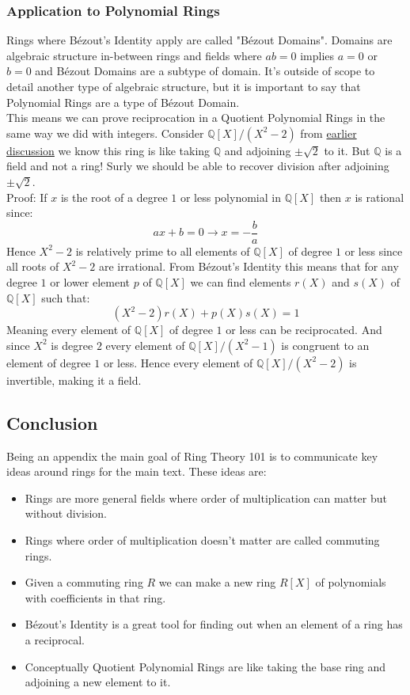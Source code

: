 \subsubsection{Application to Polynomial Rings}
Rings where Bézout's Identity apply are called "Bézout Domains".
Domains are algebraic structure in-between rings and fields where $ab=0$ implies $a=0$ or $b=0$ and Bézout Domains are a subtype of domain.
It's outside of scope to detail another type of algebraic structure,
but it is important to say that Polynomial Rings are a type of Bézout Domain.
\\

This means we can prove reciprocation in a Quotient Polynomial Rings in the same way we did with integers.
Consider $\mathbb{Q}[X]/(X^2-2)$ from \hyperref[appx:quotient-polynomial-ring]{earlier discussion} we know this ring is like taking $\mathbb{Q}$ and adjoining $\pm\sqrt{2}$ to it.
But $\mathbb{Q}$ is a field and not a ring!
Surly we should be able to recover division after adjoining $\pm\sqrt{2}$.
\\

Proof:
If $x$ is the root of a degree $1$ or less polynomial in $\mathbb{Q}[X]$ then $x$ is rational since:
\[ ax+b = 0 \rightarrow x = -\frac{b}{a}\]
Hence $X^2-2$ is relatively prime to all elements of $\mathbb{Q}[X]$ of degree $1$ or less since all roots of $X^2-2$ are irrational.
From Bézout's Identity this means that for any degree $1$ or lower element $p$ of $\mathbb{Q}[X]$ we can find elements $r(X)$ and $s(X)$ of $\mathbb{Q}[X]$ such that:
\[(X^2-2)r(X)+p(X)s(X) = 1\]
Meaning every element of $\mathbb{Q}[X]$ of degree $1$ or less can be reciprocated.
And since $X^2$ is degree $2$ every element of $\mathbb{Q}[X]/(X^2-1)$ is congruent to an element of degree $1$ or less.
Hence every element of $\mathbb{Q}[X] / (X^2 - 2)$ is invertible,
making it a field.

\subsection{Conclusion}
\label{appx:ring-conclusion}
Being an appendix the main goal of Ring Theory 101 is to communicate key ideas around rings for the main text.
These ideas are:
\begin{itemize}
	\item Rings are more general fields where order of multiplication can matter but without division.
	\item Rings where order of multiplication doesn't matter are called commuting rings.
	\item Given a commuting ring $R$ we can make a new ring $R[X]$ of polynomials with coefficients in that ring.
	\item Bézout's Identity is a great tool for finding out when an element of a ring has a reciprocal.
	\item Conceptually Quotient Polynomial Rings are like taking the base ring and adjoining a new element to it.
\end{itemize}
